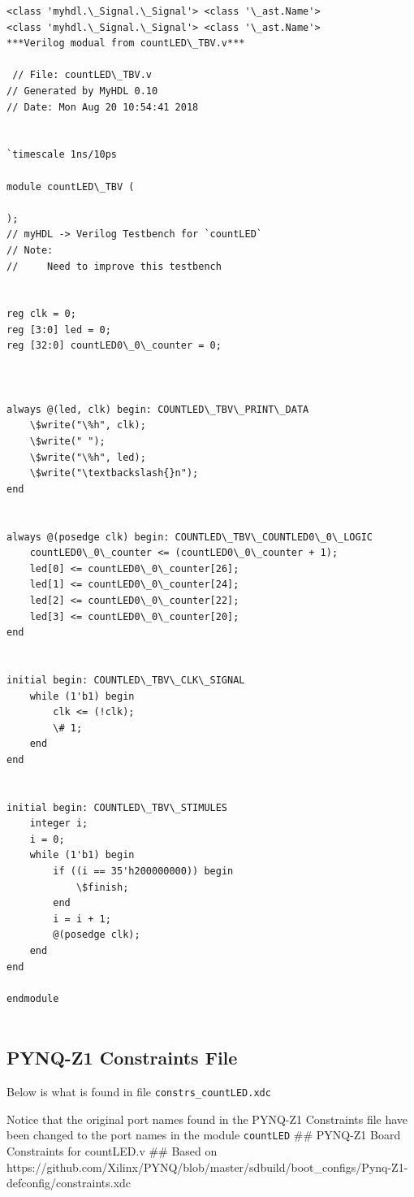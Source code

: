 \documentclass[11pt]{article}
\begin{document}
    \begin{Verbatim}[commandchars=\\\{\}]
<class 'myhdl.\_Signal.\_Signal'> <class '\_ast.Name'>
<class 'myhdl.\_Signal.\_Signal'> <class '\_ast.Name'>
***Verilog modual from countLED\_TBV.v***

 // File: countLED\_TBV.v
// Generated by MyHDL 0.10
// Date: Mon Aug 20 10:54:41 2018


`timescale 1ns/10ps

module countLED\_TBV (

);
// myHDL -> Verilog Testbench for `countLED`
// Note:
//     Need to improve this testbench


reg clk = 0;
reg [3:0] led = 0;
reg [32:0] countLED0\_0\_counter = 0;



always @(led, clk) begin: COUNTLED\_TBV\_PRINT\_DATA
    \$write("\%h", clk);
    \$write(" ");
    \$write("\%h", led);
    \$write("\textbackslash{}n");
end


always @(posedge clk) begin: COUNTLED\_TBV\_COUNTLED0\_0\_LOGIC
    countLED0\_0\_counter <= (countLED0\_0\_counter + 1);
    led[0] <= countLED0\_0\_counter[26];
    led[1] <= countLED0\_0\_counter[24];
    led[2] <= countLED0\_0\_counter[22];
    led[3] <= countLED0\_0\_counter[20];
end


initial begin: COUNTLED\_TBV\_CLK\_SIGNAL
    while (1'b1) begin
        clk <= (!clk);
        \# 1;
    end
end


initial begin: COUNTLED\_TBV\_STIMULES
    integer i;
    i = 0;
    while (1'b1) begin
        if ((i == 35'h200000000)) begin
            \$finish;
        end
        i = i + 1;
        @(posedge clk);
    end
end

endmodule


    \end{Verbatim}

    \subsection{PYNQ-Z1 Constraints File}\label{pynq-z1-constraints-file}

Below is what is found in file \texttt{constrs\_countLED.xdc}

Notice that the original port names found in the PYNQ-Z1 Constraints
file have been changed to the port names in the module \texttt{countLED}
## PYNQ-Z1 Board Constraints for countLED.v
## Based on https://github.com/Xilinx/PYNQ/blob/master/sdbuild/boot_configs/Pynq-Z1-defconfig/constraints.xdc
\end{document}
